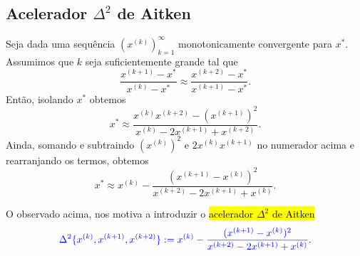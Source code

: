 \subsection{Acelerador $\Delta^2$ de Aitken}

Seja dada uma sequência $(x^{(k)})_{k=1}^\infty$ monotonicamente convergente para $x^*$. Assumimos que $k$ seja suficientemente grande tal que
\begin{equation}
  \frac{x^{(k+1)}-x^*}{x^{(k)}-x^*} \approx \frac{x^{(k+2)}-x^*}{x^{(k+1)}-x^*}.
\end{equation}
Então, isolando $x^*$ obtemos
\begin{equation}
  x^* \approx \frac{x^{(k)}x^{(k+2)}-(x^{(k+1)})^2}{x^{(k)}-2x^{(k+1)}+x^{(k+2)}}.
\end{equation}
Ainda, somando e subtraindo $(x^{(k)})^2$ e $2x^{(k)}x^{(k+1)}$ no numerador acima e rearranjando os termos, obtemos
\begin{equation}
  x^* \approx x^{(k)} - \frac{(x^{(k+1)}-x^{(k)})^2}{x^{(k+2)}-2x^{(k+1)}+x^{(k)}}.
\end{equation}

O observado acima, nos motiva a introduzir o \hl{acelerador $\Delta^2$ de Aitken}
\begin{equation}\label{cap_eq1d_sec_Steffensen:eq:ac_aitken}
  {\color{blue}\Delta^2\{x^{(k)},x^{(k+1)},x^{(k+2)}\} := x^{(k)} - \frac{(x^{(k+1)}-x^{(k)})^2}{x^{(k+2)}-2x^{(k+1)}+x^{(k)}}}.
\end{equation}



